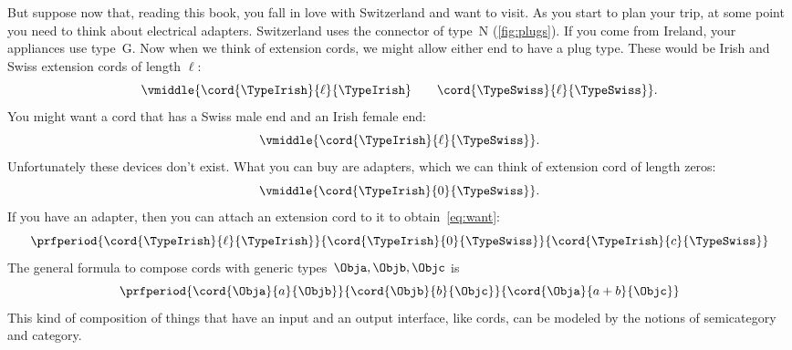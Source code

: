 But suppose now that, reading this book, you fall in love with Switzerland and want to visit.
As you start to plan your trip, at some point you need to think about electrical adapters.
Switzerland uses the connector of type~N (\cref{fig:plugs}).
If you come from Ireland, your appliances use type~G.
Now when we think of extension cords, we might allow either end to have a plug type.
%
These would be Irish and Swiss extension cords of length $\ell$:
%
\begin{equation}
    \label{eq:irish-swiss}
    \vmiddle{\cord{\TypeIrish}{\ell}{\TypeIrish} \qquad \cord{\TypeSwiss}{\ell}{\TypeSwiss}}.
\end{equation}
%
You might want a cord that has a Swiss male end and an Irish female end:
%
\begin{equation}
    \label{eq:want}
    \vmiddle{\cord{\TypeIrish}{\ell}{\TypeSwiss}}.
\end{equation}
%
Unfortunately these devices don't exist.
What you can buy are adapters, which we can think of extension cord of length zeros:
\begin{equation*}
    \vmiddle{\cord{\TypeIrish}{0}{\TypeSwiss}}.
\end{equation*}
%
If you have an adapter, then you can attach an extension cord to it to obtain~\cref{eq:want}:
%
\begin{equation}
    \label{eq:irish-swiss-result}
    \prfperiod{\cord{\TypeIrish}{\ell}{\TypeIrish}}{\cord{\TypeIrish}{0}{\TypeSwiss}}{\cord{\TypeIrish}{c}{\TypeSwiss}}
\end{equation}
%
The general formula to compose cords with generic types~$\Obja, \Objb, \Objc$ is
%
\begin{equation}
    \label{eq:cords-generic}
    \prfperiod{\cord{\Obja}{a}{\Objb}}{\cord{\Objb}{b}{\Objc}}{\cord{\Obja}{a+b}{\Objc}}
\end{equation}
%
This kind of composition of things that have an input and an output interface, like cords, can be modeled by the notions of semicategory and category.

%

%
%
%

